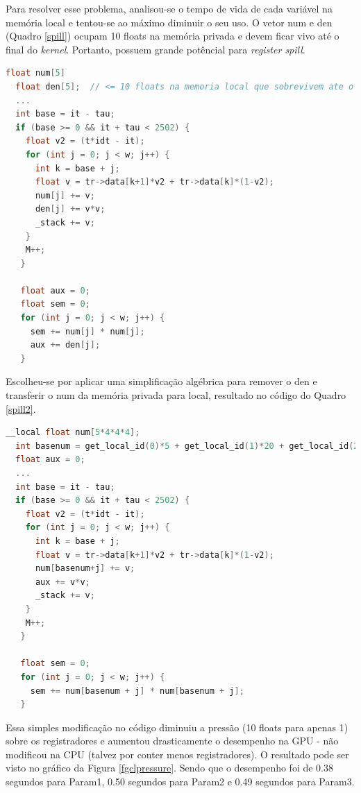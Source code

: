 \documentclass[12pt]{article}
\begin{document}
Para resolver esse problema, analisou-se o tempo de vida de cada variável na memória local e tentou-se ao máximo diminuir o seu uso. O vetor num e den (Quadro \ref{spill}) ocupam 10 floats na memória privada e devem ficar vivo até o final do \textit{kernel}. Portanto, possuem grande potêncial para \textit{register spill}. \\

\begin{lstlisting}[language=c, caption=Código não otimizado e com muitos \textit{register spill}., label=spill]
  float num[5]
  float den[5];  // <= 10 floats na memoria local que sobrevivem ate o final do loop!
  ...
  int base = it - tau;
  if (base >= 0 && it + tau < 2502) {
    float v2 = (t*idt - it);
    for (int j = 0; j < w; j++) {
      int k = base + j;
      float v = tr->data[k+1]*v2 + tr->data[k]*(1-v2);
      num[j] += v;
      den[j] += v*v;
      _stack += v;
    }
    M++;
   }
   
   float aux = 0; 
   float sem = 0;
   for (int j = 0; j < w; j++) {
     sem += num[j] * num[j];
     aux += den[j];
   }
\end{lstlisting}

Escolheu-se por aplicar uma simplificação algébrica para remover o den e transferir o num da memória privada para local, resultado no código do Quadro \ref{spill2}.

\begin{lstlisting}[language=c, caption=Código depois da otimização sobre a memória privda., label=spill2]
  __local float num[5*4*4*4];
  int basenum = get_local_id(0)*5 + get_local_id(1)*20 + get_local_id(2)*80;
  float aux = 0; 
  ...
  int base = it - tau;
  if (base >= 0 && it + tau < 2502) {
    float v2 = (t*idt - it);
    for (int j = 0; j < w; j++) {
      int k = base + j;
      float v = tr->data[k+1]*v2 + tr->data[k]*(1-v2);
      num[basenum+j] += v;
      aux += v*v;
      _stack += v;
    }
    M++;
   }
   
   float sem = 0;
   for (int j = 0; j < w; j++) {
     sem += num[basenum + j] * num[basenum + j];
   }
\end{lstlisting}

Essa simples modificação no código diminuiu a pressão (10 floats para apenas 1) sobre os registradores e aumentou drasticamente o desempenho na GPU - não modificou na CPU (talvez por conter menos registradores). O resultado pode ser visto no gráfico da Figura \ref{fgclpressure}. Sendo que o desempenho foi de 0.38 segundos para Param1, 0.50 segundos para Param2 e 0.49 segundos para Param3.
\end{document}

